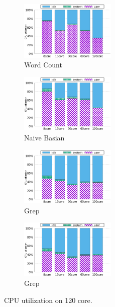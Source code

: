 \begin{figure}[tb]
    \centering
    \begin{subfigure}[b]{0.25\textwidth}
        \includegraphics[width=1.8in]{graph/wc_cpuutils_docker.eps}
        \caption{Word Count}
    \end{subfigure}%
    \begin{subfigure}[b]{0.25\textwidth}
        \includegraphics[width=1.8in]{graph/nb_cpuutils_docker.eps}
        \caption{Naive Basian}
    \end{subfigure}%
    \begin{subfigure}[b]{0.25\textwidth}
        \includegraphics[width=1.8in]{graph/grep_cpuutils_docker.eps}
        \caption{Grep}
    \end{subfigure}%
    \begin{subfigure}[b]{0.25\textwidth}
        \includegraphics[width=1.8in]{graph/grep_cpuutils_docker.eps}
        \caption{Grep}
    \end{subfigure}%
        \centering
    \caption{CPU utilization on 120 core.}
    \label{fig:utilization2}
\end{figure}




